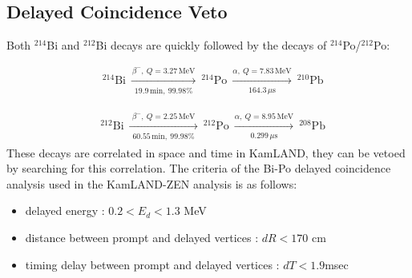 \subsection*{Delayed Coincidence Veto}
Both $^{214}$Bi and $^{212}$Bi decays are quickly followed by the decays of $^{214}$Po/$^{212}$Po:

\begin{equation}
\begin{aligned}
&^{214}\mathrm{Bi}
\ \xrightarrow[\substack{19.9\,\mathrm{min},\ 99.98\%}]{\beta^-,\ Q=3.27\,\mathrm{MeV}}
\ ^{214}\mathrm{Po}
\ \xrightarrow[\substack{164.3\,\mu\mathrm{s}}]{\alpha,\ Q=7.83\,\mathrm{MeV}}
\ ^{210}\mathrm{Pb}
\end{aligned}
\end{equation}

\begin{equation}
\begin{aligned}
&^{212}\mathrm{Bi}
\ \xrightarrow[\substack{60.55\,\mathrm{min},\ 99.98\%}]{\beta^-,\ Q=2.25\,\mathrm{MeV}}
\ ^{212}\mathrm{Po}
\ \xrightarrow[\substack{0.299\,\mu\mathrm{s}}]{\alpha,\ Q=8.95\,\mathrm{MeV}}
\ ^{208}\mathrm{Pb}
\end{aligned}
\end{equation}
These decays are correlated in space and time in KamLAND, they can be vetoed by searching for this correlation. The criteria of the Bi-Po delayed coincidence analysis used in the KamLAND-ZEN analysis is as follows:
\begin{itemize}
	\item delayed energy : $0.2 < E_d < 1.3$ MeV
	\item distance between prompt and delayed vertices : $dR<170$ cm
	\item timing delay between prompt and delayed vertices : $dT<1.9$msec
\end{itemize}

